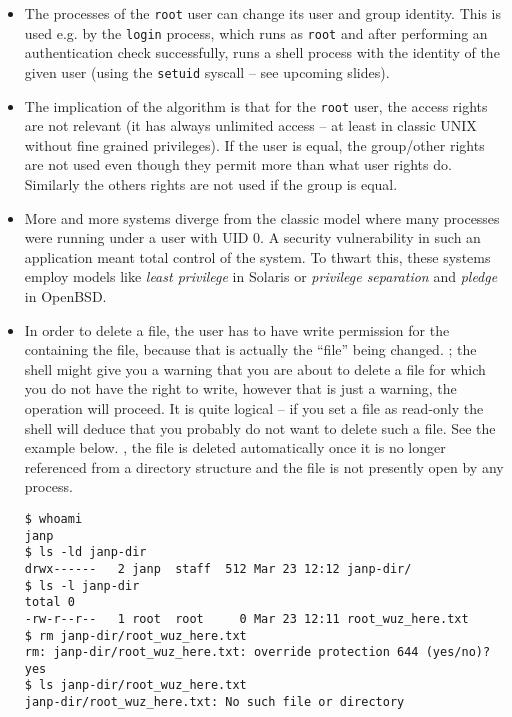 \begin{itemize}
\item The processes of the \texttt{root} user can change its user and group
identity. This is used e.g. by the \texttt{login} process, which runs as
\texttt{root} and after performing an authentication check successfully, runs
a shell process with the identity of the given user (using the \texttt{setuid} syscall
-- see upcoming slides).
\item The implication of the algorithm is that for the \texttt{root} user, the
access rights are not relevant (it has always unlimited access -- at least in
classic UNIX without fine grained privileges). If the user is equal, the
group/other rights are not used even though they permit more than what user
rights do. Similarly the others rights are not used if the group is equal.
\item More and more systems diverge from the classic model where many processes
were running under a user with UID 0. A security vulnerability in such an
application meant total control of the system. To thwart this, these systems
employ models like \emph{least privilege} in Solaris or \emph{privilege
separation} and \emph{pledge} in OpenBSD.
\item \label{FILEDELETE} In order to delete a file, the user has to have write
permission for the  containing the file, because that is actually
the ``file'' being changed. ; the shell might give you a warning that you are about to delete a
file for which you do not have the right to write, however that is just a
warning, the operation will proceed.  It is quite logical -- if you set a file
as read-only the shell will deduce that you probably do not want to delete such
a file.  See the example below.  , the file is deleted automatically once it is no longer
referenced from a directory structure and the file is not presently open by any
process.

\begin{verbatim}
$ whoami
janp
$ ls -ld janp-dir
drwx------   2 janp  staff  512 Mar 23 12:12 janp-dir/
$ ls -l janp-dir
total 0
-rw-r--r--   1 root  root     0 Mar 23 12:11 root_wuz_here.txt
$ rm janp-dir/root_wuz_here.txt 
rm: janp-dir/root_wuz_here.txt: override protection 644 (yes/no)? yes
$ ls janp-dir/root_wuz_here.txt 
janp-dir/root_wuz_here.txt: No such file or directory
\end{verbatim}


\end{itemize}
